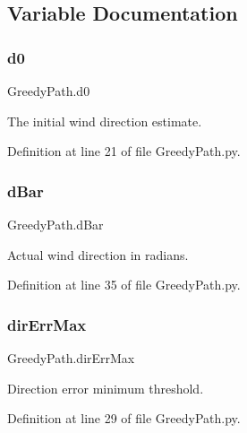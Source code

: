 \subsection{Variable Documentation}
\mbox{\label{namespace_greedy_path_a3dd8a5c17eb3ef664131b4d0070b61f8}} 
\subsubsection{\texorpdfstring{d0}{d0}}
{\footnotesize\ttfamily Greedy\+Path.\+d0}



The initial wind direction estimate. 



Definition at line 21 of file Greedy\+Path.\+py.

\mbox{\label{namespace_greedy_path_a2dca3109ed198652e8fccb34ec8cf5cc}} 
\subsubsection{\texorpdfstring{d\+Bar}{dBar}}
{\footnotesize\ttfamily Greedy\+Path.\+d\+Bar}



Actual wind direction in radians. 



Definition at line 35 of file Greedy\+Path.\+py.

\mbox{\label{namespace_greedy_path_a8ea64d8438aecf56abe3d63433b8a3ea}} 
\subsubsection{\texorpdfstring{dir\+Err\+Max}{dirErrMax}}
{\footnotesize\ttfamily Greedy\+Path.\+dir\+Err\+Max}



Direction error minimum threshold. 



Definition at line 29 of file Greedy\+Path.\+py.

\mbox{\label{namespace_greedy_path_a8e7645c081a51673f166a72dec83f08e}} 
